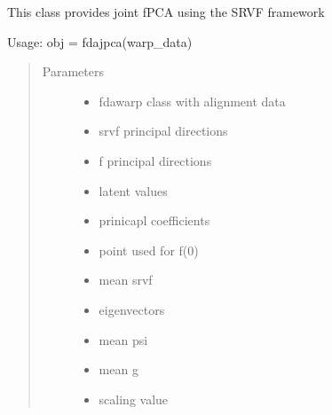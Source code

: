 \documentclass[letterpaper,10pt,english]{sphinxmanual}
\begin{document}

\begin{fulllineitems}
\label{\detokenize{fPCA:fPCA.fdajpca}}
This class provides joint fPCA using the
SRVF framework

Usage:  obj = fdajpca(warp\_data)
\begin{quote}\begin{description}
\item[{Parameters}] \leavevmode\begin{itemize}
\item {} 
 \textendash{} fdawarp class with alignment data

\item {} 
 \textendash{} srvf principal directions

\item {} 
 \textendash{} f principal directions

\item {} 
 \textendash{} latent values

\item {} 
 \textendash{} prinicapl coefficients

\item {} 
 \textendash{} point used for f(0)

\item {} 
 \textendash{} mean srvf

\item {} 
 \textendash{} eigenvectors

\item {} 
 \textendash{} mean psi

\item {} 
 \textendash{} mean g

\item {} 
 \textendash{} scaling value


\end{itemize}
\end{description}
\end{quote}
\end{fulllineitems}
\end{document}
